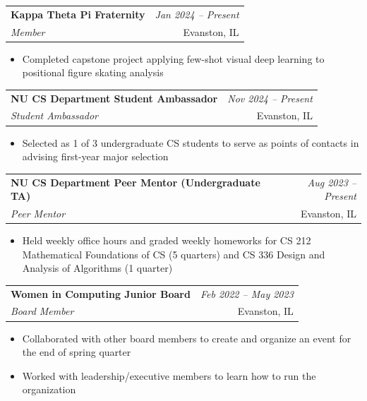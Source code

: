 \documentclass[a4paper,11pt]{article}
\makeatletter
\newcommand{\resumeSubheading}[4]{
\vspace{0.5mm}\item
    \begin{tabular*}{0.98\textwidth}[t]{l@{\extracolsep{\fill}}r}
        \textbf{#1} & \textit{\footnotesize{#4}} \\
        \textit{\footnotesize{#3}} &  \footnotesize{#2}\\
    \end{tabular*}
    \vspace{-2.4mm}
}
\newcommand{\resumeItemListStart}{\begin{itemize}[leftmargin=*,labelsep=1mm,itemsep=0.5mm]}
\newcommand{\resumeItemListEnd}{\end{itemize}\vspace{-2mm}}
\makeatother
\begin{document}
\resumeSubheading
    {Kappa Theta Pi Fraternity}{Evanston, IL}
    {Member}{Jan 2024 – Present}
    \resumeItemListStart
      \item Completed capstone project applying few-shot visual deep learning to positional figure skating analysis
    \resumeItemListEnd

\resumeSubheading
    {NU CS Department Student Ambassador}{Evanston, IL}
    {Student Ambassador}{Nov 2024 – Present}
    \resumeItemListStart
      \item Selected as 1 of 3 undergraduate CS students to serve as points of contacts in advising first-year major selection
    \resumeItemListEnd

\resumeSubheading
    {NU CS Department Peer Mentor (Undergraduate TA)}{Evanston, IL}
    {Peer Mentor}{Aug 2023 – Present}
    \resumeItemListStart
      \item Held weekly office hours and graded weekly homeworks for CS 212 Mathematical Foundations of CS (5 quarters) and CS 336 Design and Analysis of Algorithms (1 quarter) 
    \resumeItemListEnd
    
    
    
\resumeSubheading
    {Women in Computing Junior Board}{Evanston, IL}
    {Board Member}{Feb 2022 – May 2023}
    \resumeItemListStart
      \item Collaborated with other board members to create and organize an event for the end of spring quarter
      \item Worked with leadership/executive members to learn how to run the organization
    \resumeItemListEnd
    
\end{document}
